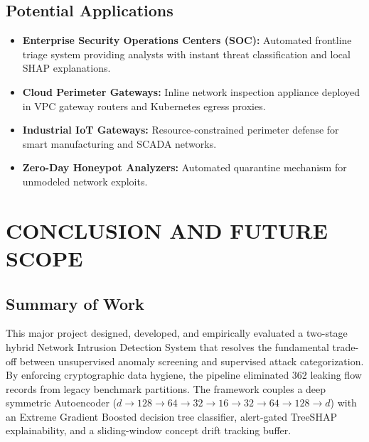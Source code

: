 \documentclass[12pt,a4paper]{report}
\begin{document}
\section{Potential Applications}
\begin{itemize}
    \item \textbf{Enterprise Security Operations Centers (SOC):} Automated frontline triage system providing analysts with instant threat classification and local SHAP explanations.
    \item \textbf{Cloud Perimeter Gateways:} Inline network inspection appliance deployed in VPC gateway routers and Kubernetes egress proxies.
    \item \textbf{Industrial IoT Gateways:} Resource-constrained perimeter defense for smart manufacturing and SCADA networks.
    \item \textbf{Zero-Day Honeypot Analyzers:} Automated quarantine mechanism for unmodeled network exploits.
\end{itemize}

\chapter{CONCLUSION AND FUTURE SCOPE}

\section{Summary of Work}
This major project designed, developed, and empirically evaluated a two-stage hybrid Network Intrusion Detection System that resolves the fundamental trade-off between unsupervised anomaly screening and supervised attack categorization. By enforcing cryptographic data hygiene, the pipeline eliminated 362 leaking flow records from legacy benchmark partitions. The framework couples a deep symmetric Autoencoder ($d \to 128 \to 64 \to 32 \to 16 \to 32 \to 64 \to 128 \to d$) with an Extreme Gradient Boosted decision tree classifier, alert-gated TreeSHAP explainability, and a sliding-window concept drift tracking buffer.
\end{document}
